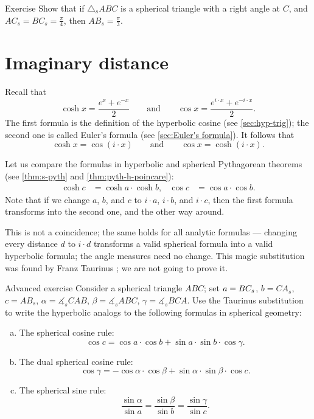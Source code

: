\begin{thm}{Exercise}\label{ex:2(pi/4)=pi/3}
Show that 
if $\triangle_sABC$ is a spherical triangle with a right angle at $C$,
and $AC_s=BC_s=\tfrac\pi4$, then $AB_s=\tfrac\pi3$.
\end{thm}



\section{Imaginary distance}

Recall that  
\[
\cosh x=\frac {e^{x}+e^{-x}}2
\qquad\text{and}\qquad
\cos x=\frac {e^{i\cdot x}+e^{-i\cdot x}}2.
\]
The first formula is the definition of the hyperbolic cosine (see \ref{sec:hyp-trig});
the second one is called Euler's formula (see \ref{sec:Euler's formula}).
It follows that 
\[\cosh x=\cos (i\cdot x)
\qquad\text{and}\qquad
\cos x=\cosh (i\cdot x).\]

Let us compare the formulas in hyperbolic and spherical Pythagorean theorems (see \ref{thm:s-pyth} and \ref{thm:pyth-h-poincare}):
\begin{align*}
\cosh c&=\cosh a\cdot \cosh b,
&
\cos c&=\cos a\cdot \cos b.
\end{align*}
Note that if we change $a$, $b$, and $c$ to $i\cdot a$, $i\cdot b$, and $i\cdot c$,
then the first formula transforms into the second one, and the other way around.

This is not a coincidence;
the same holds for all analytic formulas ---
changing every distance $d$ to $i\cdot d$ transforms a valid spherical formula into a valid hyperbolic formula;
the angle measures need no change.
This magic substitution was found by Franz Taurinus \cite{taurinus}; we are not going to prove it.

\begin{thm}{Advanced exercise}\label{ex:taurinus}
Consider a spherical triangle $ABC$; set
$a=BC_s$, $b=CA_s$, $c=AB_s$,
$\alpha=\measuredangle_sCAB$, $\beta=\measuredangle_sABC$, $\gamma=\measuredangle_sBCA$.
Use the Taurinus substitution to write the hyperbolic analogs to the following formulas in spherical geometry:

\begin{enumerate}[(a)]
\item The spherical cosine rule:
\[\cos c=\cos a \cdot \cos b+\sin a\cdot \sin b\cdot \cos\gamma.\]
\item The dual spherical cosine rule:
\[\cos \gamma=-\cos \alpha \cdot \cos \beta+\sin \alpha\cdot \sin \beta \cdot \cos c.\]
\item
The spherical sine rule:
\[\frac{\sin \alpha}{\sin a}=\frac{\sin \beta}{\sin b}=\frac{\sin \gamma}{\sin c}.\]
\end{enumerate}
 
\end{thm}

